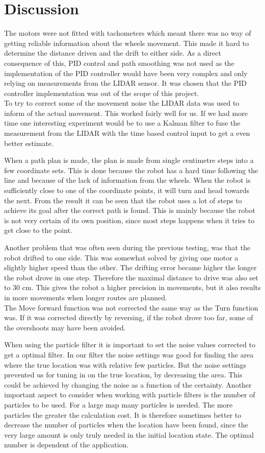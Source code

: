\chapter{Discussion}
The motors were not fitted with tachometers which meant there was no way of getting reliable information about the wheels movement. This made it hard to determine the distance driven and the drift to either side. As a direct consequence of this, PID control and path smoothing was not used as the implementation of the PID controller would have been very complex and only relying on measurements from the LIDAR sensor. It was chosen that the PID controller implementation was out of the scope of this project. \\
To try to correct some of the movement noise the LIDAR data was used to inform of the actual movement. This worked fairly well for us. If we had more time one interesting experiment would be to use a Kalman filter to fuse the measurement from the LIDAR with the time based control input to get a even better estimate.

When a path plan is made, the plan is made from single centimetre steps into a  few coordinate sets. 
This is done because the robot has a hard time following the line and because of the lack of information from the wheels. 
When the robot is sufficiently close to one of the coordinate points, it will turn and head towards the next.
From the result it can be seen that the robot uses a lot of steps to achieve its goal after the correct path is found. 
This is mainly because the robot is not very certain of its own position, since most steps happens when it tries to get close to the point.

Another problem that was often seen during the previous testing, was that the robot drifted to one side. This was somewhat solved by giving one motor a slightly higher speed than the other. The drifting error became higher the longer the robot drove in one step. Therefore the maximal distance to drive was also set to 30 cm. This gives the robot a higher precision in movements, but it also results in more movements when longer routes are planned.\\
The Move forward function was not corrected the same way as the Turn function was. If it was corrected directly by reversing, if the robot drove too far, some of the overshoots may have been avoided.

When using the particle filter it is important to set the noise values corrected to get a optimal filter. In our filter the noise settings was good for finding the area where the true location was with relative few particles. But the noise settings prevented us for tuning in on the true location, by decreasing the area. This could be achieved by changing the noise as a function of the certainty.   
Another important aspect to consider when working with particle filters is the number of particles to be used. For a large map many particles is needed. The more particles the greater the calculation cost. It is therefore sometimes better to decrease the number of particles when the location have been found, since the very large amount is only truly needed in the initial location state. The optimal number is dependent of the application.

